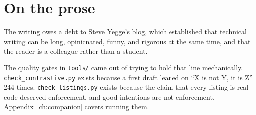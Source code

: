 \section{On the prose}

The writing owes a debt to Steve Yegge's blog, which established that technical
writing can be long, opinionated, funny, and rigorous at the same time, and that
the reader is a colleague rather than a student.

The quality gates in \texttt{tools/} came out of trying to hold that line
mechanically. \texttt{check\_\allowbreak contrastive.py} exists because a first
draft leaned on ``X is not Y, it is Z'' 244 times.
\texttt{check\_\allowbreak listings.py} exists because the claim that every
listing is real code deserved enforcement, and good intentions are not
enforcement. Appendix~\ref{ch:companion} covers running them.
